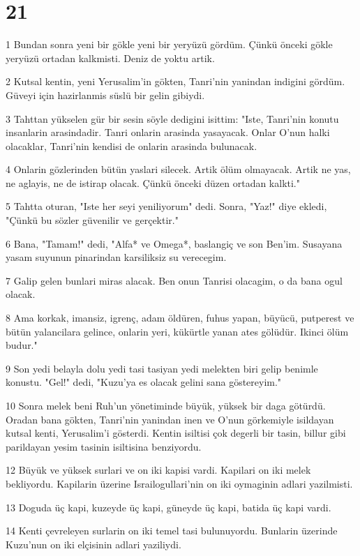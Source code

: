 \chapter{21}

\par 1 Bundan sonra yeni bir gökle yeni bir yeryüzü gördüm. Çünkü önceki gökle yeryüzü ortadan kalkmisti. Deniz de yoktu artik.
\par 2 Kutsal kentin, yeni Yerusalim'in gökten, Tanri'nin yanindan indigini gördüm. Güveyi için hazirlanmis süslü bir gelin gibiydi.
\par 3 Tahttan yükselen gür bir sesin söyle dedigini isittim: "Iste, Tanri'nin konutu insanlarin arasindadir. Tanri onlarin arasinda yasayacak. Onlar O'nun halki olacaklar, Tanri'nin kendisi de onlarin arasinda bulunacak.
\par 4 Onlarin gözlerinden bütün yaslari silecek. Artik ölüm olmayacak. Artik ne yas, ne aglayis, ne de istirap olacak. Çünkü önceki düzen ortadan kalkti."
\par 5 Tahtta oturan, "Iste her seyi yeniliyorum" dedi. Sonra, "Yaz!" diye ekledi, "Çünkü bu sözler güvenilir ve gerçektir."
\par 6 Bana, "Tamam!" dedi, "Alfa* ve Omega*, baslangiç ve son Ben'im. Susayana yasam suyunun pinarindan karsiliksiz su verecegim.
\par 7 Galip gelen bunlari miras alacak. Ben onun Tanrisi olacagim, o da bana ogul olacak.
\par 8 Ama korkak, imansiz, igrenç, adam öldüren, fuhus yapan, büyücü, putperest ve bütün yalancilara gelince, onlarin yeri, kükürtle yanan ates gölüdür. Ikinci ölüm budur."
\par 9 Son yedi belayla dolu yedi tasi tasiyan yedi melekten biri gelip benimle konustu. "Gel!" dedi, "Kuzu'ya es olacak gelini sana göstereyim."
\par 10 Sonra melek beni Ruh'un yönetiminde büyük, yüksek bir daga götürdü. Oradan bana gökten, Tanri'nin yanindan inen ve O'nun görkemiyle isildayan kutsal kenti, Yerusalim'i gösterdi. Kentin isiltisi çok degerli bir tasin, billur gibi parildayan yesim tasinin isiltisina benziyordu.
\par 12 Büyük ve yüksek surlari ve on iki kapisi vardi. Kapilari on iki melek bekliyordu. Kapilarin üzerine Israilogullari'nin on iki oymaginin adlari yazilmisti.
\par 13 Doguda üç kapi, kuzeyde üç kapi, güneyde üç kapi, batida üç kapi vardi.
\par 14 Kenti çevreleyen surlarin on iki temel tasi bulunuyordu. Bunlarin üzerinde Kuzu'nun on iki elçisinin adlari yaziliydi.
